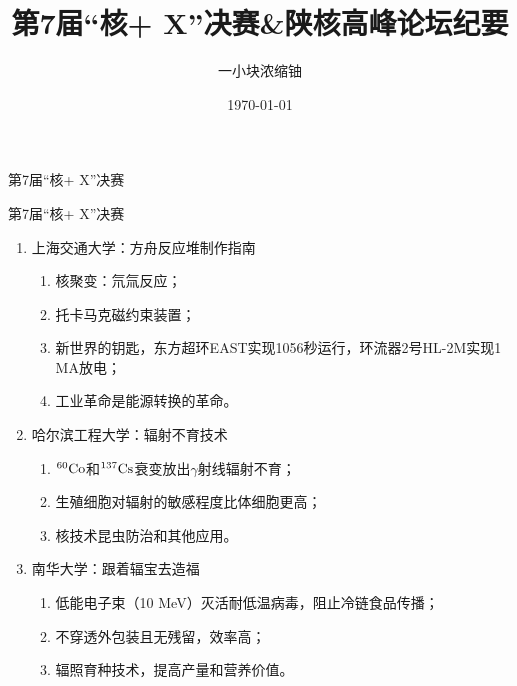 \documentclass{ctexbeamer}
\title{第7届“核+ X”决赛\&陕核高峰论坛纪要}
\date{\today}
\author{一小块浓缩铀 \quad \faRadiation* \quad \href{https://github.com/Enriched-Uranium/Nuclear-Reactor-Physics}{\faGithub}}
\institute{西安交通大学 \quad 核科学与技术学院}
\begin{document}
\maketitle

\begin{frame}[standout]
    \huge 第7届“核+ X”决赛
\end{frame}

\begin{frame}{第7届“核+ X”决赛}
    \begin{enumerate}
        \item 上海交通大学：方舟反应堆制作指南
        \begin{enumerate}
            \item 核聚变：氘氚反应；
            \item 托卡马克磁约束装置；
            \item 新世界的钥匙，东方超环EAST实现1056秒运行，环流器2号HL-2M实现1 MA放电；
            \item 工业革命是能源转换的革命。
        \end{enumerate}
        \item 哈尔滨工程大学：辐射不育技术
        \begin{enumerate}
            \item ${}^{60}{\rm Co}$和${}^{137}{\rm Cs}$衰变放出$\gamma$射线辐射不育；
            \item 生殖细胞对辐射的敏感程度比体细胞更高；
            \item 核技术昆虫防治和其他应用。
        \end{enumerate}
        \item 南华大学：跟着辐宝去造福
        \begin{enumerate}
            \item 低能电子束（10 MeV）灭活耐低温病毒，阻止冷链食品传播；
            \item 不穿透外包装且无残留，效率高；
            \item 辐照育种技术，提高产量和营养价值。
        \end{enumerate}
    \end{enumerate}
\end{frame}
\end{document}
